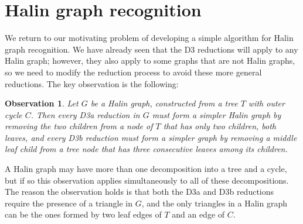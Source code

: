 \documentclass{article}
\newtheorem{observation}{Observation}
\begin{document}
\section{Halin graph recognition}

We return to our motivating problem of developing a simple algorithm for Halin graph recognition.
We have already seen that the D3 reductions will apply to any Halin graph; however, they also apply to some graphs that are not Halin graphs, so we need to modify the reduction process to avoid
these more general reductions. The key observation is the following:

\begin{observation}
\label{obs:reduction-is-at-leaves}
Let $G$ be a Halin graph, constructed from a tree $T$ with outer cycle $C$. Then every D3a reduction in $G$ must form a simpler Halin graph by removing the two children from a node of $T$ that has only two children, both leaves, and every D3b reduction must form a simpler graph by removing a middle leaf child from a tree node that has three consecutive leaves among its children.
\end{observation}

A Halin graph may have more than one decomposition into a tree and a cycle, but if so this observation applies simultaneously to all of these decompositions. The reason the observation holds is that both the D3a and D3b reductions require the presence of a triangle in $G$, and the only triangles in a Halin graph can be the ones formed by two leaf edges of $T$ and an edge of $C$.
\end{document}
